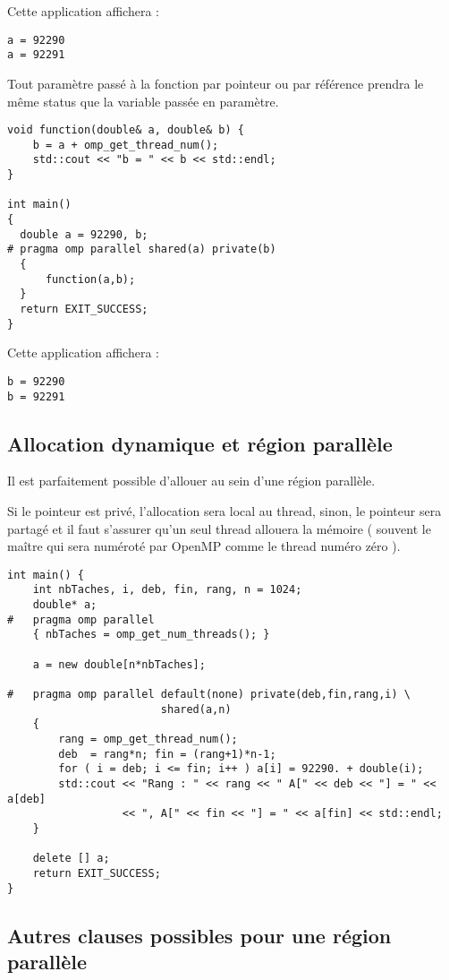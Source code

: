 \documentclass[fleqn,11pt]{article}
\begin{document}
Cette application affichera :
\begin{verbatim}
a = 92290
a = 92291
\end{verbatim}

Tout paramètre passé à la fonction par pointeur ou par référence prendra le même status que la variable passée en paramètre.

\begin{lstlisting}
void function(double& a, double& b) {
    b = a + omp_get_thread_num();
    std::cout << "b = " << b << std::endl;
}

int main()
{
  double a = 92290, b;
# pragma omp parallel shared(a) private(b)
  {
      function(a,b);
  }
  return EXIT_SUCCESS;
}
\end{lstlisting}

Cette application affichera :
\begin{verbatim}
b = 92290
b = 92291
\end{verbatim}

\subsection{Allocation dynamique et région parallèle}

Il est parfaitement possible d'allouer au sein d'une région parallèle.

Si le pointeur est privé, l'allocation sera local au thread, sinon, le pointeur sera partagé et il faut s'assurer qu'un seul thread allouera la mémoire ( souvent le maître qui sera numéroté par OpenMP comme le thread numéro zéro ).

\begin{lstlisting}
int main() {
    int nbTaches, i, deb, fin, rang, n = 1024;
    double* a;
#   pragma omp parallel
    { nbTaches = omp_get_num_threads(); }

    a = new double[n*nbTaches];
    
#   pragma omp parallel default(none) private(deb,fin,rang,i) \
                        shared(a,n)
    {
        rang = omp_get_thread_num();
        deb  = rang*n; fin = (rang+1)*n-1;
        for ( i = deb; i <= fin; i++ ) a[i] = 92290. + double(i);
        std::cout << "Rang : " << rang << " A[" << deb << "] = " << a[deb]
                  << ", A[" << fin << "] = " << a[fin] << std::endl;
    }
    
    delete [] a;
    return EXIT_SUCCESS;
}
\end{lstlisting}

\subsection{Autres clauses possibles pour une région parallèle}
\end{document}
